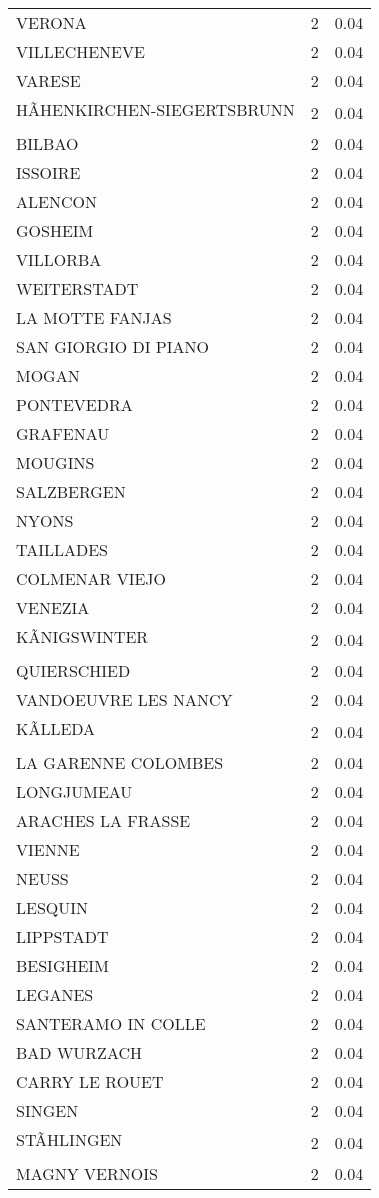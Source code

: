 \begin{table*}[htbp]
\begin{tabular}{lrr}
VERONA & 2 & 0.04 \\
VILLECHENEVE & 2 & 0.04 \\
VARESE & 2 & 0.04 \\
HÃHENKIRCHEN-SIEGERTSBRUNN & 2 & 0.04 \\
BILBAO & 2 & 0.04 \\
ISSOIRE & 2 & 0.04 \\
ALENCON & 2 & 0.04 \\
GOSHEIM & 2 & 0.04 \\
VILLORBA & 2 & 0.04 \\
WEITERSTADT & 2 & 0.04 \\
LA MOTTE FANJAS & 2 & 0.04 \\
SAN GIORGIO DI PIANO & 2 & 0.04 \\
MOGAN & 2 & 0.04 \\
PONTEVEDRA & 2 & 0.04 \\
GRAFENAU & 2 & 0.04 \\
MOUGINS & 2 & 0.04 \\
SALZBERGEN & 2 & 0.04 \\
NYONS & 2 & 0.04 \\
TAILLADES & 2 & 0.04 \\
COLMENAR VIEJO & 2 & 0.04 \\
VENEZIA & 2 & 0.04 \\
KÃNIGSWINTER & 2 & 0.04 \\
QUIERSCHIED & 2 & 0.04 \\
VANDOEUVRE LES NANCY & 2 & 0.04 \\
KÃLLEDA & 2 & 0.04 \\
LA GARENNE COLOMBES & 2 & 0.04 \\
LONGJUMEAU & 2 & 0.04 \\
ARACHES LA FRASSE & 2 & 0.04 \\
VIENNE & 2 & 0.04 \\
NEUSS & 2 & 0.04 \\
LESQUIN & 2 & 0.04 \\
LIPPSTADT & 2 & 0.04 \\
BESIGHEIM & 2 & 0.04 \\
LEGANES & 2 & 0.04 \\
SANTERAMO IN COLLE & 2 & 0.04 \\
BAD WURZACH & 2 & 0.04 \\
CARRY LE ROUET & 2 & 0.04 \\
SINGEN & 2 & 0.04 \\
STÃHLINGEN & 2 & 0.04 \\
MAGNY VERNOIS & 2 & 0.04 \\

\end{tabular}
\end{table*}
